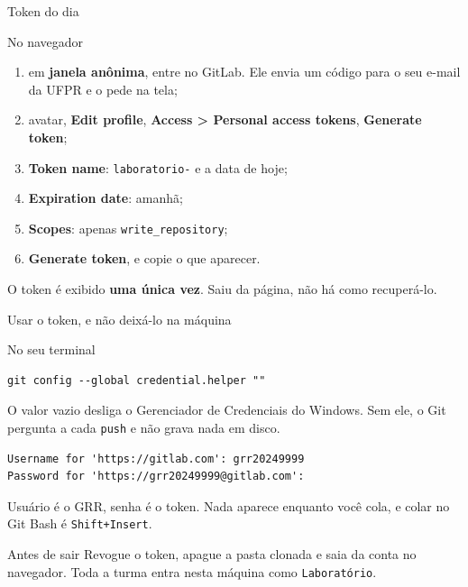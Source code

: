 \documentclass{beamer}
\newenvironment{noterminal}
  {\begin{exampleblock}{No seu terminal}}
  {\end{exampleblock}}
\newenvironment{nonavegador}
  {\begin{exampleblock}{No navegador}}
  {\end{exampleblock}}
\begin{document}
\begin{frame}{Token do dia}
  \begin{nonavegador}
    \begin{enumerate}
      \item em \textbf{janela anônima}, entre no GitLab. Ele envia um código
            para o seu e-mail da UFPR e o pede na tela;
      \item avatar, \textbf{Edit profile}, \textbf{Access > Personal access
            tokens}, \textbf{Generate token};
      \item \textbf{Token name}: \texttt{laboratorio-} e a data de hoje;
      \item \textbf{Expiration date}: amanhã;
      \item \textbf{Scopes}: apenas \texttt{write\_repository};
      \item \textbf{Generate token}, e copie o que aparecer.
    \end{enumerate}
  \end{nonavegador}

  \vspace{0.3cm}
  \begin{alertblock}{}
    O token é exibido \textbf{uma única vez}. Saiu da página, não há como
    recuperá-lo.
  \end{alertblock}
\end{frame}

\begin{frame}[fragile]{Usar o token, e não deixá-lo na máquina}
  \begin{noterminal}
    \begin{verbatim}
git config --global credential.helper ""
    \end{verbatim}
  \end{noterminal}

  O valor vazio desliga o Gerenciador de Credenciais do Windows. Sem ele, o Git
  pergunta a cada \texttt{push} e não grava nada em disco.

  \begin{verbatim}
Username for 'https://gitlab.com': grr20249999
Password for 'https://grr20249999@gitlab.com':
  \end{verbatim}

  Usuário é o GRR, senha é o token. Nada aparece enquanto você cola, e colar no
  Git Bash é \texttt{Shift+Insert}.

  \vspace{0.2cm}
  \begin{alertblock}{Antes de sair}
    Revogue o token, apague a pasta clonada e saia da conta no navegador. Toda a
    turma entra nesta máquina como \texttt{Laboratório}.
  \end{alertblock}
\end{frame}
\end{document}

